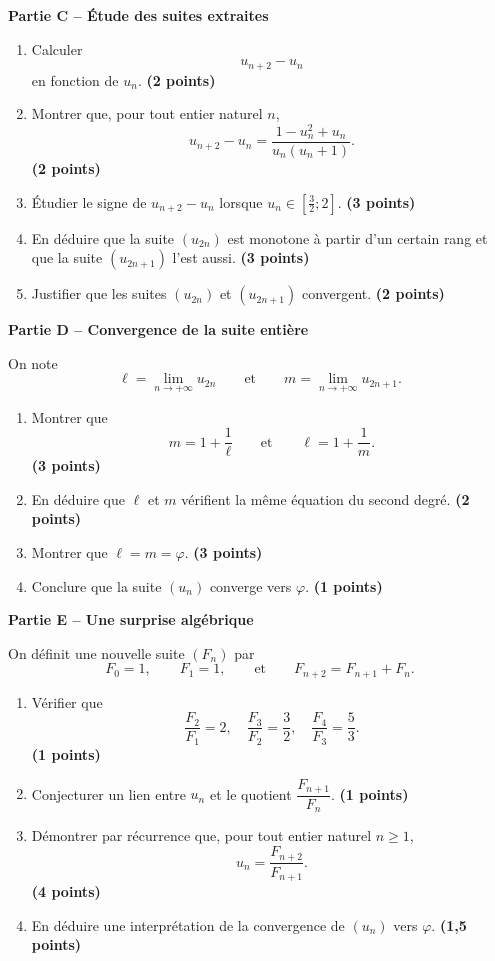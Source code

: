 \documentclass[11pt,a4paper]{article}
\newcommand{\bareme}[1]{\hfill{\color{blue!70!black}\textbf{(#1 points)}}}
\begin{document}
\medskip

\textbf{Partie C -- Étude des suites extraites}

\begin{enumerate}[label=\textbf{C.\arabic*.}, leftmargin=0.9cm]
    \item Calculer
    \[
    u_{n+2}-u_n
    \]
    en fonction de $u_n$. \bareme{2}
    \item Montrer que, pour tout entier naturel $n$,
    \[
    u_{n+2}-u_n=\frac{1-u_n^2+u_n}{u_n(u_n+1)}.
    \]
    \bareme{2}
    \item Étudier le signe de $u_{n+2}-u_n$ lorsque $u_n\in\left[\frac32;2\right]$. \bareme{3}
    \item En déduire que la suite $(u_{2n})$ est monotone à partir d’un certain rang et que la suite $(u_{2n+1})$ l’est aussi. \bareme{3}
    \item Justifier que les suites $(u_{2n})$ et $(u_{2n+1})$ convergent. \bareme{2}
\end{enumerate}

\medskip

\textbf{Partie D -- Convergence de la suite entière}

On note
\[
\ell=\lim_{n\to+\infty}u_{2n}
\qquad \text{et} \qquad
m=\lim_{n\to+\infty}u_{2n+1}.
\]

\begin{enumerate}[label=\textbf{D.\arabic*.}, leftmargin=0.9cm]
    \item Montrer que
    \[
    m=1+\frac{1}{\ell}
    \qquad \text{et} \qquad
    \ell=1+\frac{1}{m}.
    \]
    \bareme{3}
    \item En déduire que $\ell$ et $m$ vérifient la même équation du second degré. \bareme{2}
    \item Montrer que $\ell=m=\varphi$. \bareme{3}
    \item Conclure que la suite $(u_n)$ converge vers $\varphi$. \bareme{1}
\end{enumerate}

\medskip

\textbf{Partie E -- Une surprise algébrique}

On définit une nouvelle suite $(F_n)$ par
\[
F_0=1,\qquad F_1=1,\qquad \text{et}\qquad F_{n+2}=F_{n+1}+F_n.
\]

\begin{enumerate}[label=\textbf{E.\arabic*.}, leftmargin=0.9cm]
    \item Vérifier que
    \[
    \frac{F_2}{F_1}=2,\quad \frac{F_3}{F_2}=\frac32,\quad \frac{F_4}{F_3}=\frac53.
    \]
    \bareme{1}
    \item Conjecturer un lien entre $u_n$ et le quotient $\dfrac{F_{n+1}}{F_n}$. \bareme{1}
    \item Démontrer par récurrence que, pour tout entier naturel $n\geq 1$,
    \[
    u_n=\frac{F_{n+2}}{F_{n+1}}.
    \]
    \bareme{4}
    \item En déduire une interprétation de la convergence de $(u_n)$ vers $\varphi$. \bareme{1,5}
\end{enumerate}
\end{document}
